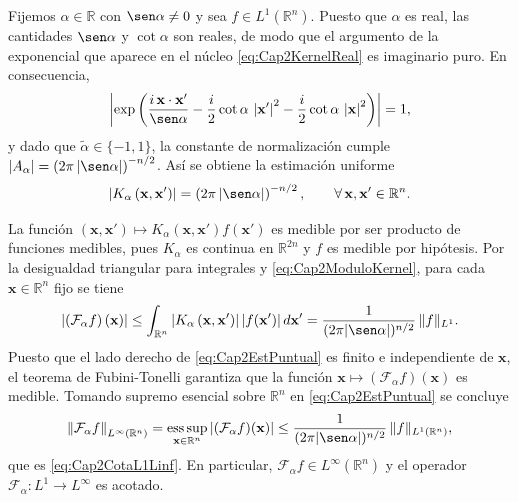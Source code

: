             \begin{Proof}
                Fijemos $\alpha \in \mathbb{R}$ con $\sen\alpha \neq 0$ y sea $f \in L^1(\mathbb{R}^n)$. Puesto que $\alpha$ es real, las cantidades $\sen\alpha$ y $\cot\alpha$ son reales, de modo que el argumento de la exponencial que aparece en el núcleo \eqref{eq:Cap2KernelReal} es imaginario puro. En consecuencia,
                \begin{equation*}
                    \left|\exp \left(\frac{i\,\mathbf{x}\cdot\mathbf{x}'}{\sen\alpha} -\frac{i}{2}\cot\alpha\, \left|\mathbf{x}'\right|^2  -\frac{i}{2}\cot\alpha\, \left|\mathbf{x}\right|^2\right)\right| = 1,
                \end{equation*}
                y dado que $\tilde{\alpha}\in \{-1,1\}$, la constante de normalización cumple $|A_\alpha| = \left(2\pi \left|\sen\alpha\right|\right)^{-n/2}$. Así se obtiene la estimación uniforme
                \begin{equation}\label{eq:Cap2ModuloKernel}
                    \left|K_\alpha\left(\mathbf{x},\mathbf{x}'\right)\right| = \left(2\pi \left|\sen\alpha\right|\right)^{-n/2}, \qquad \forall\, \mathbf{x},\mathbf{x}' \in \mathbb{R}^n.
                \end{equation}

                La función $(\mathbf{x},\mathbf{x}')\mapsto K_\alpha(\mathbf{x},\mathbf{x}')f(\mathbf{x}')$ es medible por ser producto de funciones medibles, pues $K_\alpha$ es continua en $\mathbb{R}^{2n}$ y $f$ es medible por hipótesis. Por la desigualdad triangular para integrales \citep[Prop. 2.13]{folland1999real} y \eqref{eq:Cap2ModuloKernel}, para cada $\mathbf{x}\in \mathbb{R}^n$ fijo se tiene
                \begin{equation}\label{eq:Cap2EstPuntual}
                    \left| \left(\mathcal{F}_\alpha f \right)(\mathbf{x}) \right| \leq \int_{\mathbb{R}^n}\left|K_\alpha \left( \mathbf{x},\mathbf{x}' \right)\right| \left|f(\mathbf{x}')\right|d\mathbf{x}' = \frac{1}{(2\pi|\sen\alpha|)^{n/2}} \, \|f\|_{L^1}.
                \end{equation}
                Puesto que el lado derecho de \eqref{eq:Cap2EstPuntual} es finito e independiente de $\mathbf{x}$, el teorema de Fubini-Tonelli \citep[Thm. 2.37]{folland1999real} garantiza que la función $\mathbf{x}\mapsto (\mathcal{F}_\alpha f)(\mathbf{x})$ es medible. Tomando supremo esencial sobre $\mathbb{R}^n$ en \eqref{eq:Cap2EstPuntual} se concluye
                \begin{equation*}
                    \left\|\mathcal{F}_\alpha f \right\|_{L^\infty(\mathbb{R}^n)} = \operatorname*{ess\,sup}_{\mathbf{x}\in \mathbb{R}^n}\left|(\mathcal{F}_\alpha f)(\mathbf{x})\right|\leq \frac{1}{(2\pi|\sen\alpha|)^{n/2}} \, \|f\|_{L^1(\mathbb{R}^n)},
                \end{equation*}
                que es \eqref{eq:Cap2CotaL1Linf}. En particular, $\mathcal{F}_\alpha f \in L^\infty(\mathbb{R}^n)$ y el operador $\mathcal{F}_\alpha : L^1\to L^\infty$ es acotado.
            \end{Proof}

